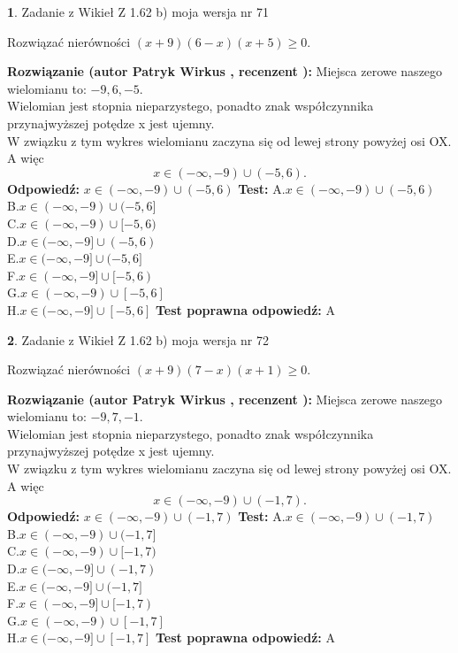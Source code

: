 \documentclass[12pt, a4paper]{article}
\theoremstyle{definition} %
\newtheorem{zad}{}
\newcommand{\zadStart}[1]{\begin{zad}#1\newline}
\newcommand{\zadStop}{\end{zad}}
\newcommand{\rozwStart}[2]{\noindent \textbf{Rozwiązanie (autor #1 , recenzent #2): }\newline}
\newcommand{\rozwStop}{\newline}
\newcommand{\odpStart}{\noindent \textbf{Odpowiedź:}\newline}
\newcommand{\odpStop}{\newline}
\newcommand{\testStart}{\noindent \textbf{Test:}\newline}
\newcommand{\testStop}{\newline}
\newcommand{\kluczStart}{\noindent \textbf{Test poprawna odpowiedź:}\newline}
\newcommand{\kluczStop}{\newline}
\begin{document}
\zadStart{Zadanie z Wikieł Z 1.62 b) moja wersja nr 71}

Rozwiązać nierówności $(x+9)(6-x)(x+5)\ge0$.
\zadStop
\rozwStart{Patryk Wirkus}{}
Miejsca zerowe naszego wielomianu to: $-9, 6, -5$.\\
Wielomian jest stopnia nieparzystego, ponadto znak współczynnika przy\linebreak najwyższej potędze x jest ujemny.\\ W związku z tym wykres wielomianu zaczyna się od lewej strony powyżej osi OX. A więc $$x \in (-\infty,-9) \cup (-5,6).$$
\rozwStop
\odpStart
$x \in (-\infty,-9) \cup (-5,6)$
\odpStop
\testStart
A.$x \in (-\infty,-9) \cup (-5,6)$\\
B.$x \in (-\infty,-9) \cup (-5,6]$\\
C.$x \in (-\infty,-9) \cup [-5,6)$\\
D.$x \in (-\infty,-9] \cup (-5,6)$\\
E.$x \in (-\infty,-9] \cup (-5,6]$\\
F.$x \in (-\infty,-9] \cup [-5,6)$\\
G.$x \in (-\infty,-9) \cup [-5,6]$\\
H.$x \in (-\infty,-9] \cup [-5,6]$
\testStop
\kluczStart
A
\kluczStop



\zadStart{Zadanie z Wikieł Z 1.62 b) moja wersja nr 72}

Rozwiązać nierówności $(x+9)(7-x)(x+1)\ge0$.
\zadStop
\rozwStart{Patryk Wirkus}{}
Miejsca zerowe naszego wielomianu to: $-9, 7, -1$.\\
Wielomian jest stopnia nieparzystego, ponadto znak współczynnika przy\linebreak najwyższej potędze x jest ujemny.\\ W związku z tym wykres wielomianu zaczyna się od lewej strony powyżej osi OX. A więc $$x \in (-\infty,-9) \cup (-1,7).$$
\rozwStop
\odpStart
$x \in (-\infty,-9) \cup (-1,7)$
\odpStop
\testStart
A.$x \in (-\infty,-9) \cup (-1,7)$\\
B.$x \in (-\infty,-9) \cup (-1,7]$\\
C.$x \in (-\infty,-9) \cup [-1,7)$\\
D.$x \in (-\infty,-9] \cup (-1,7)$\\
E.$x \in (-\infty,-9] \cup (-1,7]$\\
F.$x \in (-\infty,-9] \cup [-1,7)$\\
G.$x \in (-\infty,-9) \cup [-1,7]$\\
H.$x \in (-\infty,-9] \cup [-1,7]$
\testStop
\kluczStart
A
\kluczStop
\end{document}
